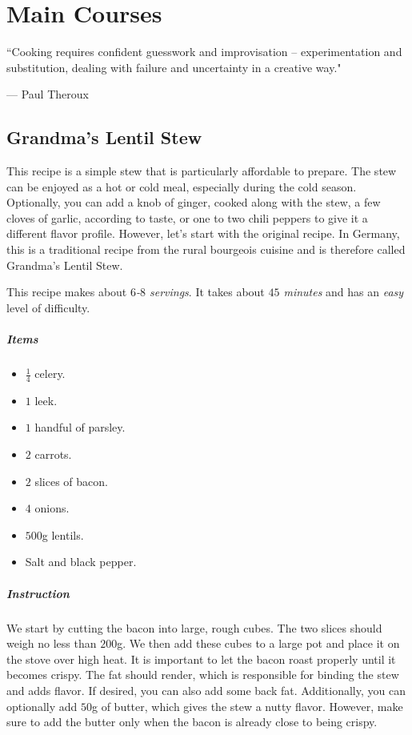 \chapter{Main Courses}
\label{mains}
\epigraph{``Cooking requires confident guesswork and improvisation -- experimentation and substitution, dealing with failure and uncertainty in a creative way."}{--- \textup{Paul Theroux}}

\section{Grandma's Lentil Stew}
\label{grandmaslentilsstew}

This recipe is a simple stew that is particularly affordable to prepare. The stew can be enjoyed as a hot or cold meal, especially during the cold season. Optionally, you can add a knob of ginger, cooked along with the stew, a few cloves of garlic, according to taste, or one to two chili peppers to give it a different flavor profile. However, let's start with the original recipe. In Germany, this is a traditional recipe from the rural bourgeois cuisine and is therefore called Grandma's Lentil Stew.

This recipe makes about \emph{$6$-$8$ servings}. It takes about \emph{$45$ minutes} and has an \emph{easy} level of difficulty. 

\paragraph{Items}
\begin{itemize}[noitemsep]
	\item[\ding{182}] $\frac{1}{4}$ celery.
	\item[\ding{183}] $1$ leek.
	\item[\ding{184}] $1$ handful of parsley.
	\item[\ding{185}] $2$ carrots.
	\item[\ding{186}] $2$ slices of bacon.
	\item[\ding{187}] $4$ onions.
	\item[\ding{188}] $500$g lentils.
	\item[\ding{189}] Salt and black pepper.
\end{itemize}

\paragraph{Instruction} 
We start by cutting the bacon into large, rough cubes. The two slices should weigh no less than $200$g. We then add these cubes to a large pot and place it on the stove over high heat. It is important to let the bacon roast properly until it becomes crispy. The fat should render, which is responsible for binding the stew and adds flavor. If desired, you can also add some back fat. Additionally, you can optionally add $50$g of butter, which gives the stew a nutty flavor. However, make sure to add the butter only when the bacon is already close to being crispy.

